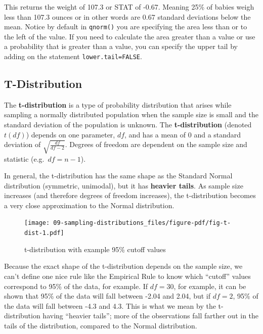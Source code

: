 \documentclass[
  letterpaper,
  DIV=11,
  numbers=noendperiod]{scrreprt}
\theoremstyle{definition}
\theoremstyle{remark}
\begin{document}
This returns the weight of 107.3 or STAT of -0.67. Meaning 25\% of
babies weigh less than 107.3 ounces or in other words are 0.67 standard
deviations below the mean. Notice by default in \texttt{qnorm()} you are
specifying the area less than or to the left of the value. If you need
to calculate the area greater than a value or use a probability that is
greater than a value, you can specify the upper tail by adding on the
statement \texttt{lower.tail=FALSE}.

\hypertarget{t-distribution}{%
\subsection{T-Distribution}\label{t-distribution}}

The \textbf{t-distribution} is a type of probability distribution that
arises while sampling a normally distributed population when the sample
size is small and the standard deviation of the population is unknown.
The \textbf{t-distribution} (denoted \(t(df)\)) depends on one
parameter, \(df\), and has a mean of 0 and a standard deviation of
\(\sqrt{\frac{df}{df-2}}\). Degrees of freedom are dependent on the
sample size and statistic (e.g.~\(df = n - 1\)).

In general, the t-distribution has the same shape as the Standard Normal
distribution (symmetric, unimodal), but it has \textbf{heavier tails}.
As sample size increases (and therefore degrees of freedom increases),
the t-distribution becomes a very close approximation to the Normal
distribution.

\begin{figure}

{\centering \texttt{[image: 09-sampling-distributions\_files/figure-pdf/fig-t-dist-1.pdf]}

}

\caption{\label{fig-t-dist}t-distribution with example 95\% cutoff
values}

\end{figure}

Because the exact shape of the t-distribution depends on the sample
size, we can't define one nice rule like the Empirical Rule to know
which ``cutoff'' values correspond to 95\% of the data, for example. If
\(df = 30\), for example, it can be shown that 95\% of the data will
fall between -2.04 and 2.04, but if \(df = 2\), 95\% of the data will
fall between -4.3 and 4.3. This is what we mean by the t-distribution
having ``heavier tails''; more of the observations fall farther out in
the tails of the distribution, compared to the Normal distribution.
\end{document}
